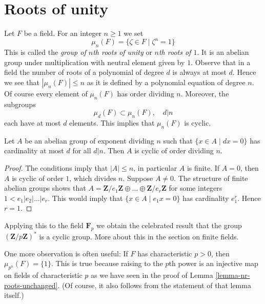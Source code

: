 \section{Roots of unity}
\label{section-roots-of-1}

\noindent
Let $F$ be a field. For an integer $n \geq 1$ we set
$$
\mu_n(F) = \{\zeta \in F \mid \zeta^n = 1\}
$$
This is called the {\it group of $n$th roots of unity} or
{\it $n$th roots of $1$}. It is an abelian group under multiplication
with neutral element given by $1$.
Observe that in a field the number of roots of a polynomial of degree $d$
is always at most $d$. Hence we see that $|\mu_n(F)| \leq n$
as it is defined by a polynomial equation of degree $n$.
Of course every element of $\mu_n(F)$ has order dividing $n$.
Moreover, the subgroups
$$
\mu_d(F) \subset \mu_n(F),\quad d | n
$$
each have at most $d$ elements. This implies that $\mu_n(F)$ is cyclic.

\begin{lemma}
\label{lemma-cyclic}
Let $A$ be an abelian group of exponent dividing $n$ such that
$\{x \in A \mid dx = 0\}$ has cardinality at most $d$ for all $d | n$.
Then $A$ is cyclic of order dividing $n$.
\end{lemma}

\begin{proof}
The conditions imply that $|A| \leq n$, in particular $A$ is finite.
If $A = 0$, then $A$ is cyclic of order $1$, which divides $n$.
Suppose $A \not = 0$. The structure of finite abelian groups shows that
$A = \mathbf{Z}/e_1\mathbf{Z} \oplus \ldots \oplus \mathbf{Z}/e_r\mathbf{Z}$
for some integers $1 < e_1 | e_2 | \ldots | e_r$. This would imply
that $\{x \in A \mid e_1 x = 0\}$ has cardinality $e_1^r$. Hence
$r = 1$.
\end{proof}

\noindent
Applying this to the field $\mathbf{F}_p$ we obtain the celebrated result
that the group $(\mathbf{Z}/p\mathbf{Z})^*$ is a cyclic group. More about
this in the section on finite fields.

\medskip\noindent
One more observation is often useful: If $F$ has characteristic
$p > 0$, then $\mu_{p^n}(F) = \{1\}$. This is true because raising
to the $p$th power is an injective map on fields of characteristic $p$
as we have seen in the proof of Lemma \ref{lemma-nr-roots-unchanged}.
(Of course, it also follows from the statement of that lemma itself.)






